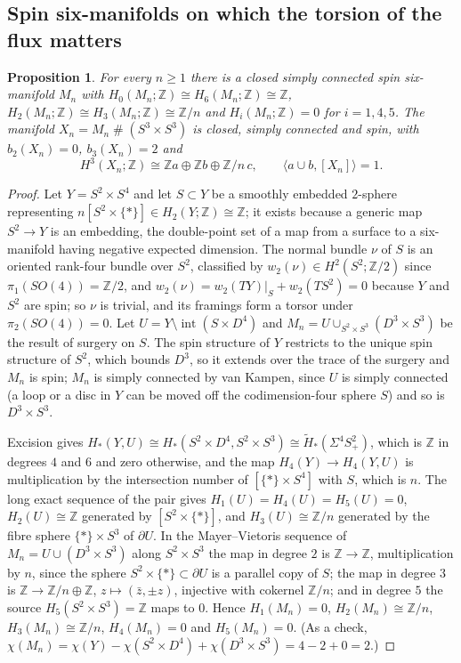 \documentclass[reqno,11pt]{amsart}
\newtheorem{proposition}[theorem]{Proposition}
\theoremstyle{definition}
\newcommand{\ZZ}{\mathbb{Z}}
\begin{document}
\subsection{Spin six-manifolds on which the torsion of the flux matters}
\begin{proposition}\label{prop:surgery}
For every $n\ge1$ there is a closed simply connected spin six-manifold $M_n$ with $H_0(M_n;\ZZ)\cong H_6(M_n;\ZZ)\cong\ZZ$, $H_2(M_n;\ZZ)\cong H_3(M_n;\ZZ)\cong\ZZ/n$ and $H_i(M_n;\ZZ)=0$ for $i=1,4,5$. The manifold $X_n=M_n\mathbin\#(S^3\times S^3)$ is closed, simply connected and spin, with $b_2(X_n)=0$, $b_3(X_n)=2$ and
\[
H^3(X_n;\ZZ)\cong\ZZ a\oplus\ZZ b\oplus\ZZ/n\,c,\qquad\langle a\cup b,[X_n]\rangle=1 .
\]
\end{proposition}

\begin{proof}
Let $Y=S^2\times S^4$ and let $S\subset Y$ be a smoothly embedded $2$-sphere representing $n[S^2\times\{*\}]\in H_2(Y;\ZZ)\cong\ZZ$; it exists because a generic map $S^2\to Y$ is an embedding, the double-point set of a map from a surface to a six-manifold having negative expected dimension. The normal bundle $\nu$ of $S$ is an oriented rank-four bundle over $S^2$, classified by $w_2(\nu)\in H^2(S^2;\ZZ/2)$ since $\pi_1(SO(4))=\ZZ/2$, and $w_2(\nu)=w_2(TY)|_S+w_2(TS^2)=0$ because $Y$ and $S^2$ are spin; so $\nu$ is trivial, and its framings form a torsor under $\pi_2(SO(4))=0$. Let $U=Y\setminus\operatorname{int}(S\times D^4)$ and $M_n=U\cup_{S^2\times S^3}(D^3\times S^3)$ be the result of surgery on $S$. The spin structure of $Y$ restricts to the unique spin structure of $S^2$, which bounds $D^3$, so it extends over the trace of the surgery and $M_n$ is spin; $M_n$ is simply connected by van Kampen, since $U$ is simply connected (a loop or a disc in $Y$ can be moved off the codimension-four sphere $S$) and so is $D^3\times S^3$.

Excision gives $H_*(Y,U)\cong H_*(S^2\times D^4,S^2\times S^3)\cong\widetilde H_*(\Sigma^4S^2_+)$, which is $\ZZ$ in degrees $4$ and $6$ and zero otherwise, and the map $H_4(Y)\to H_4(Y,U)$ is multiplication by the intersection number of $[\{*\}\times S^4]$ with $S$, which is $n$. The long exact sequence of the pair gives $H_1(U)=H_4(U)=H_5(U)=0$, $H_2(U)\cong\ZZ$ generated by $[S^2\times\{*\}]$, and $H_3(U)\cong\ZZ/n$ generated by the fibre sphere $\{*\}\times S^3$ of $\partial U$. In the Mayer--Vietoris sequence of $M_n=U\cup(D^3\times S^3)$ along $S^2\times S^3$ the map in degree $2$ is $\ZZ\to\ZZ$, multiplication by $n$, since the sphere $S^2\times\{*\}\subset\partial U$ is a parallel copy of $S$; the map in degree $3$ is $\ZZ\to\ZZ/n\oplus\ZZ$, $z\mapsto(\bar z,\pm z)$, injective with cokernel $\ZZ/n$; and in degree $5$ the source $H_5(S^2\times S^3)=\ZZ$ maps to $0$. Hence $H_1(M_n)=0$, $H_2(M_n)\cong\ZZ/n$, $H_3(M_n)\cong\ZZ/n$, $H_4(M_n)=0$ and $H_5(M_n)=0$. (As a check, $\chi(M_n)=\chi(Y)-\chi(S^2\times D^4)+\chi(D^3\times S^3)=4-2+0=2$.)


\end{proof}
\end{document}
